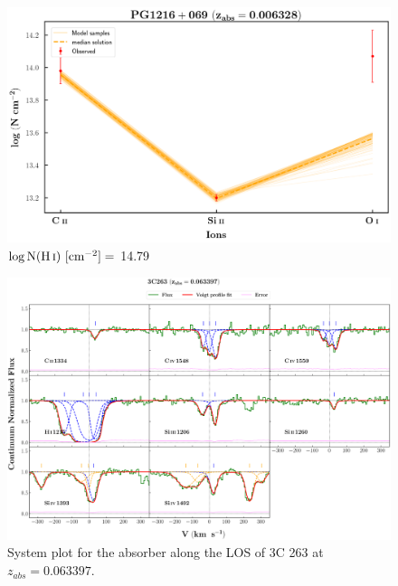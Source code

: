   \begin{figure}[!h]
    \centering
    \includegraphics[width=0.9\linewidth]{Ionisation-Modelling-Plots/pg1216-z=0.006328-compIII_logZ=1.png}
    \caption{$\log \text{N}(\ion{H}{i}) \ [\text{cm}^{-2}]=$ 14.79}
  \end{figure}
  
  
  \newpage
  
  \begin{landscape}
  
  \begin{figure}
      \centering
      \vspace{-20mm}
      \hspace*{-35mm}
      \includegraphics[width=1.25\linewidth]{System-Plots/3C263_z=0.063397_sys_plot.png}
      \caption{System plot for the absorber along the LOS of 3C 263 at $z_{abs} = 0.063397$. }
  \end{figure}
  
  \end{landscape}
  
